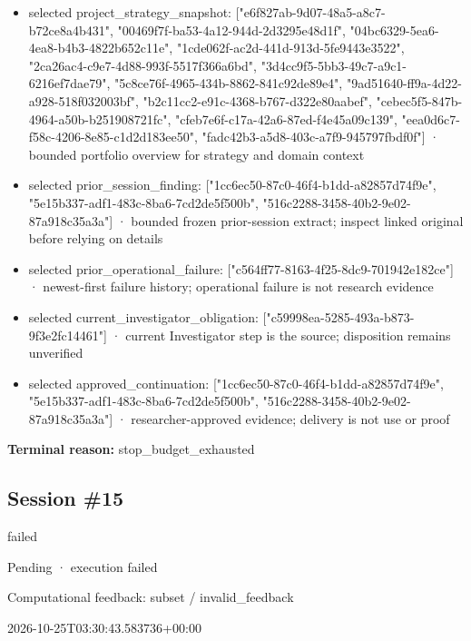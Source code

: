 \documentclass[11pt]{article}
\begin{document}
\begin{itemize}
\item selected project\_strategy\_snapshot: ["e6f827ab-9d07-48a5-a8c7-b72ce8a4b431", "00469f7f-ba53-4a12-944d-2d3295e48d1f", "04bc6329-5ea6-4ea8-b4b3-4822b652c11e", "1cde062f-ac2d-441d-913d-5fe9443e3522", "2ca26ac4-c9e7-4d88-993f-5517f366a6bd", "3d4cc9f5-5bb3-49c7-a9c1-6216ef7dae79", "5c8ce76f-4965-434b-8862-841c92de89e4", "9ad51640-ff9a-4d22-a928-518f032003bf", "b2c11cc2-e91c-4368-b767-d322e80aabef", "cebec5f5-847b-4964-a50b-b251908721fc", "cfeb7e6f-c17a-42a6-87ed-f4e45a09c139", "eea0d6c7-f58c-4206-8e85-c1d2d183ee50", "fadc42b3-a5d8-403c-a7f9-945797fbdf0f"] · bounded portfolio overview for strategy and domain context
\item selected prior\_session\_finding: ["1cc6ec50-87c0-46f4-b1dd-a82857d74f9e", "5e15b337-adf1-483c-8ba6-7cd2de5f500b", "516c2288-3458-40b2-9e02-87a918c35a3a"] · bounded frozen prior-session extract; inspect linked original before relying on details
\item selected prior\_operational\_failure: ["c564ff77-8163-4f25-8dc9-701942e182ce"] · newest-first failure history; operational failure is not research evidence
\item selected current\_investigator\_obligation: ["c59998ea-5285-493a-b873-9f3e2fc14461"] · current Investigator step is the source; disposition remains unverified
\item selected approved\_continuation: ["1cc6ec50-87c0-46f4-b1dd-a82857d74f9e", "5e15b337-adf1-483c-8ba6-7cd2de5f500b", "516c2288-3458-40b2-9e02-87a918c35a3a"] · researcher-approved evidence; delivery is not use or proof
\end{itemize}
\textbf{Terminal reason:} stop\_budget\_exhausted\par
\subsection{Session \#15}
\begin{description}[style=nextline,font=\normalfont\bfseries,leftmargin=0pt,labelsep=0pt]
\item[Execution status] failed
\item[Outcome] Pending · execution failed
\item[Strategy] Computational feedback: subset / invalid\_feedback
\item[Started] 2026-10-25T03:30:43.583736+00:00
\end{description}
\end{document}
